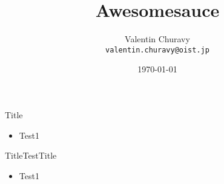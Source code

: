 \documentclass{beamer}
\title{Awesomesauce}
\date{\today}
\author[V. Churavy]{Valentin Churavy \\ \texttt{valentin.churavy@oist.jp}}
\begin{document}
\begin{frame}
\titlepage
\end{frame}

\begin{frame}{Title}
\begin{itemize}
  \item Test1
\end{itemize}
\end{frame}
\begin{frame}{Title}{TestTitle}
\begin{itemize}
  \item Test1
\end{itemize}
\end{frame}
\end{document}

